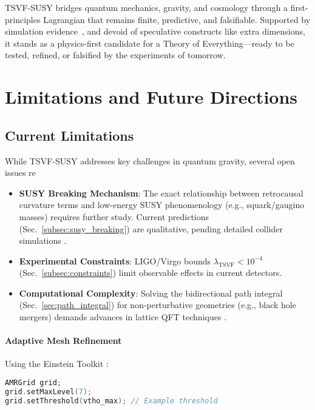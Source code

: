\documentclass[twocolumn,superscriptaddress,floatfix]{revtex4-2}
\begin{document}
TSVF-SUSY bridges quantum mechanics, gravity, and cosmology through a first-principles Lagrangian that remains finite, predictive, and falsifiable. Supported by simulation evidence~\cite{tsvf-susy-gw,tsvf-susy-darkenergy}, and devoid of speculative constructs like extra dimensions, it stands as a physics-first candidate for a Theory of Everything—ready to be tested, refined, or falsified by the experiments of tomorrow.


\section{Limitations and Future Directions}  
\label{sec:limitations}  

\subsection{Current Limitations}  
\label{subsec:limitations}  

While TSVF-SUSY addresses key challenges in quantum gravity, several open issues re  
\begin{itemize}  
\item \textbf{SUSY Breaking Mechanism}: The exact relationship between retrocausal curvature terms and low-energy SUSY phenomenology (e.g., squark/gaugino masses) requires further study. Current predictions (Sec.~\ref{subsec:susy_breaking}) are qualitative, pending detailed collider simulations \cite{Allanach2021}.  
\item \textbf{Experimental Constraints}: LIGO/Virgo bounds \(\lambda_{\text{TSVF}} < 10^{-4}\) (Sec.~\ref{subsec:constraints}) limit observable effects in current detectors.  
\item \textbf{Computational Complexity}: Solving the bidirectional path integral (Sec.~\ref{sec:path_integral}) for non-perturbative geometries (e.g., black hole mergers) demands advances in lattice QFT techniques \cite{Lehner2019}.  
\end{itemize}  

\paragraph{Adaptive Mesh Refinement}
Using the Einstein Toolkit \cite{EinsteinToolkit2023}:
\begin{lstlisting}[language=C++, basicstyle=\small\ttfamily]
AMRGrid grid;
grid.setMaxLevel(7);
grid.setThreshold(vtho_max); // Example threshold
\end{lstlisting}
\end{document}
